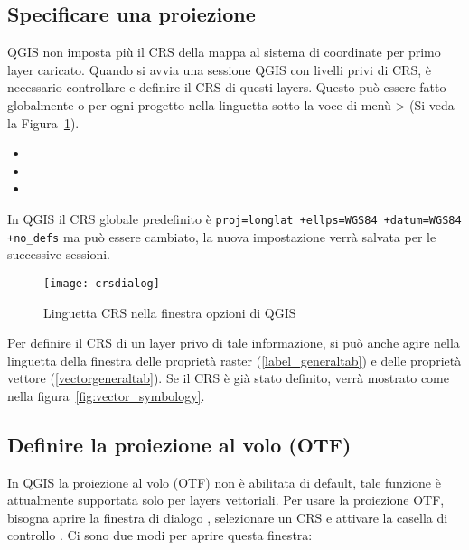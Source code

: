\subsection{Specificare una proiezione}
\label{sec:projection-specifying}

QGIS non imposta più il CRS della mappa al sistema di coordinate per primo
layer caricato. Quando si avvia una sessione QGIS con livelli privi di CRS,
è necessario controllare e definire il CRS di questi layers. Questo può
essere fatto globalmente o per ogni progetto nella linguetta  sotto
la voce di menù  >
 (Si veda la Figura~\ref{fig:crsdialog}). 

\begin{itemize}
\item {} 
\item {}
\item {}
\end{itemize}

In QGIS il CRS globale predefinito è \texttt{proj=longlat +ellps=WGS84 +datum=WGS84
+no\_defs} ma può essere cambiato, la nuova impostazione verrà salvata per le
successive sessioni.    

\begin{figure}[ht]
   \begin{center}
   \caption{Linguetta CRS nella finestra opzioni di QGIS \nixcaption}\label{fig:crsdialog}\smallskip
   \texttt{[image: crsdialog]}
\end{center}
\end{figure}

Per definire il CRS di un layer privo di tale informazione, si può anche agire
nella linguetta  della finestra delle proprietà raster (\ref{label_generaltab})
e delle proprietà vettore (\ref{vectorgeneraltab}). Se il CRS è già stato
definito, verrà mostrato come nella figura~\ref{fig:vector_symbology}.

\subsection{Definire la proiezione al volo (OTF)}\label{label_projstart}

In QGIS la proiezione al volo (OTF) non è abilitata di default, tale funzione
è attualmente supportata solo per layers vettoriali. Per usare la proiezione OTF,
bisogna aprire la finestra di dialogo
, selezionare un CRS
e attivare la casella di controllo .
Ci sono due modi per aprire questa finestra:

